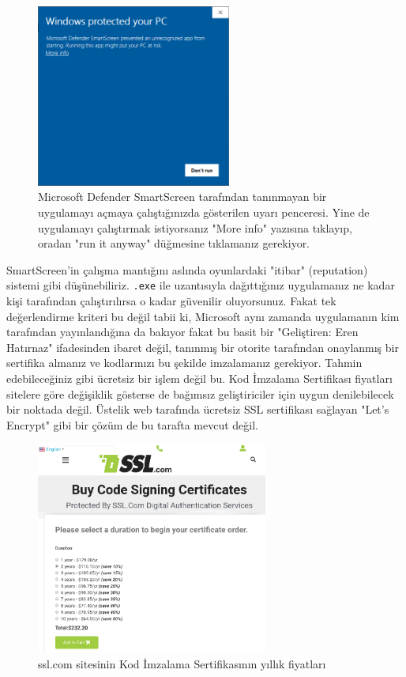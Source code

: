 \documentclass[11pt]{article}
\begin{document}
\begin{figure}[htbp]
\centering
\includegraphics[height=6cm]{gorseller/smartscreen-uyari.png}
\caption{Microsoft Defender SmartScreen tarafından tanınmayan bir uygulamayı açmaya çalıştığınızda gösterilen uyarı penceresi. Yine de uygulamayı çalıştırmak istiyorsanız "More info" yazısına tıklayıp, oradan "run it anyway" düğmesine tıklamanız gerekiyor.}
\end{figure}

SmartScreen'in çalışma mantığını aslında oyunlardaki "itibar" (reputation)
sistemi gibi düşünebiliriz. \texttt{.exe} ile uzantısıyla dağıttığınız uygulamanız ne
kadar kişi tarafından çalıştırılırsa o kadar güvenilir oluyorsunuz. Fakat tek
değerlendirme kriteri bu değil tabii ki, Microsoft aynı zamanda uygulamanın
kim tarafından yayınlandığına da bakıyor fakat bu basit bir "Geliştiren: Eren
Hatırnaz" ifadesinden ibaret değil, tanınmış bir otorite tarafından onaylanmış
bir sertifika almanız ve kodlarınızı bu şekilde imzalamanız gerekiyor. Tahmin
edebileceğiniz gibi ücretsiz bir işlem değil bu. Kod İmzalama Sertifikası
fiyatları sitelere göre değişiklik gösterse de bağımsız geliştiriciler için
uygun denilebilecek bir noktada değil. Üstelik web tarafında ücretsiz SSL
sertifikası sağlayan "Let's Encrypt" gibi bir çözüm de bu tarafta mevcut
değil.

\begin{figure}[htbp]
\centering
\includegraphics[height=7cm]{gorseller/sslcom-code-signing-fiyatlar.png}
\caption{ssl.com sitesinin Kod İmzalama Sertifikasının yıllık fiyatları}
\end{figure}
\end{document}
